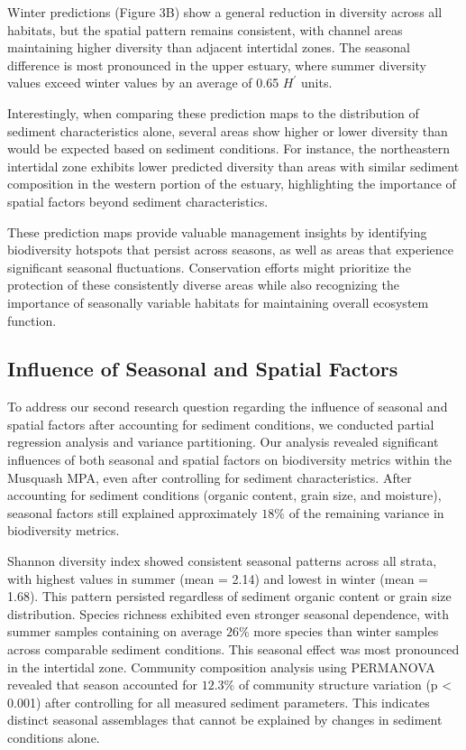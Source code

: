 \documentclass[12pt]{article}
\begin{document}
\qquad Winter predictions (Figure 3B) show a general reduction in diversity
across all habitats, but the spatial pattern remains consistent, with channel
areas maintaining higher diversity than adjacent intertidal zones. The seasonal
difference is most pronounced in the upper estuary, where summer diversity
values exceed winter values by an average of 0.65 $H^{\prime}$ units.

\qquad Interestingly, when comparing these prediction maps to the distribution
of sediment characteristics alone, several areas show higher or lower diversity
than would be expected based on sediment conditions. For instance, the
northeastern intertidal zone exhibits lower predicted diversity than areas with
similar sediment composition in the western portion of the estuary, highlighting
the importance of spatial factors beyond sediment characteristics.

\qquad These prediction maps provide valuable management insights by identifying
biodiversity hotspots that persist across seasons, as well as areas that
experience significant seasonal fluctuations. Conservation efforts might
prioritize the protection of these consistently diverse areas while also
recognizing the importance of seasonally variable habitats for maintaining
overall ecosystem function.


\subsection{Influence of Seasonal and Spatial Factors}

\qquad To address our second research question regarding the influence of
seasonal and spatial factors after accounting for sediment conditions, we
conducted partial regression analysis and variance partitioning. Our analysis
revealed significant influences of both seasonal and spatial factors on
biodiversity metrics within the Musquash MPA, even after controlling for
sediment characteristics. After accounting for sediment conditions (organic
content, grain size, and moisture), seasonal factors still explained
approximately $18\%$ of the remaining variance in biodiversity metrics.

\qquad Shannon diversity index showed consistent seasonal patterns across all
strata, with highest values in summer (mean = 2.14) and lowest in winter (mean =
1.68). This pattern persisted regardless of sediment organic content or grain
size distribution. Species richness exhibited even stronger seasonal dependence,
with summer samples containing on average $26\%$ more species than winter
samples across comparable sediment conditions. This seasonal effect was most
pronounced in the intertidal zone. Community composition analysis using
PERMANOVA revealed that season accounted for $12.3\%$ of community structure
variation (p < 0.001) after controlling for all measured sediment parameters.
This indicates distinct seasonal assemblages that cannot be explained by changes
in sediment conditions alone.
\end{document}
